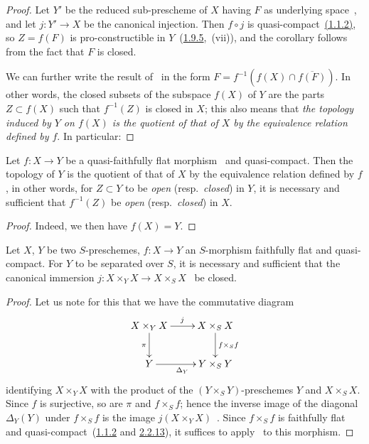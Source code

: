 \begin{proof}
Let $Y'$ be the reduced sub-prescheme of $X$ having $F$ as underlying space~, and let $j:Y'\to X$ be the canonical injection.
Then $f\circ j$ is quasi-compact~{\hyperref[IV.1.1.2]{(1.1.2)}}, so $Z=f(F)$ is pro-constructible in $Y$~({\hyperref[IV.1.9.5]{1.9.5}},~(vii)), and the corollary follows from the fact that $F$ is closed.

We can further write the result of~ in the form $F=f^{-1}(f(X)\cap\overline{f(F)})$.
In other words, the closed subsets of the subspace $f(X)$ of $Y$ are the parts $Z\subset f(X)$ such that $f^{-1}(Z)$ is closed in $X$; this also means that \emph{the topology induced by $Y$ on $f(X)$ is the quotient of that of $X$ by the equivalence relation defined by $f$}.
In particular:
\end{proof}

\begin{corollary}[2.3.12]
\label{IV.2.3.12}
Let $f:X\to Y$ be a quasi-faithfully flat morphism~ and quasi-compact.
Then the topology of $Y$ is the quotient of that of $X$ by the equivalence relation defined by $f$, \textup{in other words, for $Z\subset Y$ to be \emph{open} (resp.\ \emph{closed}) in $Y$, it is necessary and sufficient that $f^{-1}(Z)$ be \emph{open} (resp.\ \emph{closed}) in $X$}.
\end{corollary}

\begin{proof}
Indeed, we then have $f(X)=Y$.
\end{proof}

\begin{corollary}[2.3.13]
\label{IV.2.3.13}
Let $X$, $Y$ be two $S$-preschemes, $f:X\to Y$ an $S$-morphism faithfully flat and quasi-compact.
For $Y$ to be separated over $S$, it is necessary and sufficient that the canonical immersion $j:X\times_Y X\to X\times_S X$~ be closed.
\end{corollary}

\begin{proof}
Let us note for this that we have the commutative diagram~
\[
\xymatrix{
  X\times_Y X \ar[r]^j \ar[d]_{\pi} & X\times_S X \ar[d]^{f\times_S f}\\
  Y \ar[r]_{\Delta_Y} & Y\times_S Y
}
\]
identifying $X\times_Y X$ with the product of the $(Y\times_S Y)$-preschemes $Y$ and $X\times_S X$.
Since $f$ is surjective, so are $\pi$ and $f\times_S f$; hence the inverse image of the diagonal $\Delta_Y(Y)$ under $f\times_S f$ is the image $j(X\times_Y X)$~.
Since $f\times_S f$ is faithfully flat and quasi-compact~({\hyperref[IV.1.1.2]{1.1.2}} and {\hyperref[IV.2.2.13]{2.2.13}}), it suffices to apply~ to this morphism.
\end{proof}


